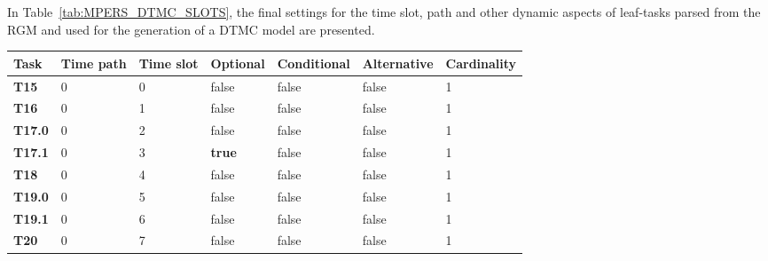 

In Table~\ref{tab:MPERS_DTMC_SLOTS}, the final settings for the time slot, path and other dynamic aspects of leaf-tasks parsed from the RGM and used for the generation of a DTMC model are presented.

\begin{table}
{\renewcommand{\arraystretch}{1.5}
\begin{tabularx}{\textwidth}{@{}lllllll@{}}
\toprule
\textbf{Task}  & \textbf{Time path} & \textbf{Time slot} & \textbf{Optional} & \textbf{Conditional} & \textbf{Alternative} & \textbf{Cardinality} \\ \midrule
\textbf{T15}   & 0                  & 0                  & false             & false                & false                & 1           \\
\textbf{T16}   & 0                  & 1                  & false             & false                & false                & 1           \\
\textbf{T17.0} & 0                  & 2                  & false             & false                & false                & 1           \\
\textbf{T17.1} & 0                  & 3                  & \textbf{true}    & false                 & false                & 1           \\
\textbf{T18}   & 0                  & 4                  & false             & false                & false                & 1           \\
\textbf{T19.0} & 0                  & 5                  & false             & false                & false                & 1           \\
\textbf{T19.1} & 0                  & 6                  & false             & false                & false                & 1           \\
\textbf{T20}   & 0                  & 7                  & false             & false                & false                & 1           \\

\end{tabularx}}
\end{table}

